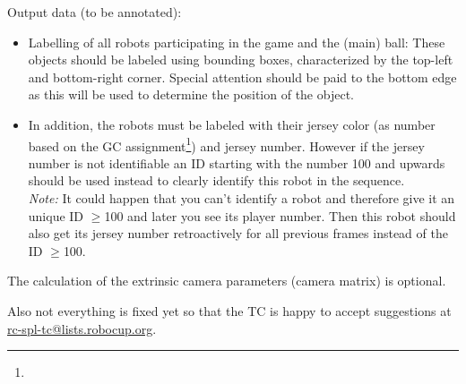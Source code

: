     Output data (to be annotated):
    \begin{itemize}
        \item Labelling of all robots participating in the game and the (main) ball: These objects should be labeled using bounding boxes, characterized by the top-left and bottom-right corner. Special attention should be paid to the bottom edge as this will be used to determine the position of the object.
        \item In addition, the robots must be labeled with their jersey color (as number based on the GC assignment\footnote{}) and jersey number. However if the jersey number is not identifiable an ID starting with the number 100 and upwards should be used instead to clearly identify this robot in the sequence. \\
        \textit{Note:} It could happen that you can't identify a robot and therefore give it an unique ID $\geq$100 and later you see its player number. Then this robot should also get its jersey number retroactively for all previous frames instead of the ID $\geq$100.
    \end{itemize}
    The calculation of the extrinsic camera parameters (camera matrix) is optional.

    Also not everything is fixed yet so that the TC is happy to accept suggestions at \url{rc-spl-tc@lists.robocup.org}.
